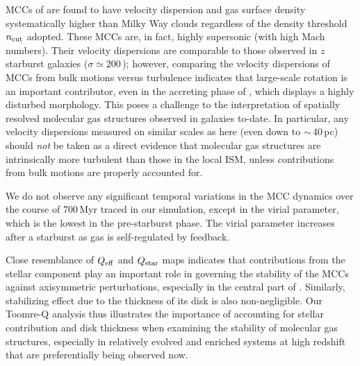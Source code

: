 \IfFileExists{emulateapjlegacy.cls}{\documentclass[iop]{emulateapjlegacy}}{\documentclass[iop]{emulateapj}}
\begin{document}
MCCs of \flower are found to have velocity dispersion and gas surface density systematically higher than
Milky Way clouds regardless of the density threshold $n_{\rm cut}$ adopted.
These MCCs are, in fact, highly supersonic (with high Mach numbers).
Their velocity dispersions are comparable to those observed in $z$ starburst galaxies ($\sigma\simeq200$\,\kms); however,
comparing the velocity dispersions of MCCs from bulk motions versus turbulence
indicates that large-scale rotation is an important contributor, even in the
accreting phase of \flower, which displays a highly disturbed morphology.
This poses a challenge to the interpretation of spatially resolved molecular gas structures observed in \highz galaxies to-date.
In particular, any velocity dispersions measured on similar scales as here (even down to $\sim$\,40\,pc)
should {\em not} be taken as a direct evidence that \highz molecular gas structures are intrinsically more turbulent than those in the local ISM,
unless contributions from bulk motions are properly accounted for.

We do not observe any significant temporal variations in the MCC dynamics over the course of 700\,Myr
traced in our simulation, except in the virial parameter, which is the lowest in the pre-starburst phase.
The virial parameter increases after a starburst as gas is self-regulated by feedback.

Close resemblance of $Q_{\rm eff}$ and $Q_{\rm star}$ maps
indicates that contributions from the stellar component play an important role in governing the stability of the MCCs against
axisymmetric perturbations, especially in the central part of \flower. Similarly, stabilizing effect due to the thickness of its disk is also
non-negligible. Our Toomre-Q analysis thus illustrates the importance of accounting for stellar contribution
and disk thickness when examining the stability of
molecular gas structures, especially in relatively evolved and enriched systems at high redshift that are preferentially being observed now.
\end{document}

